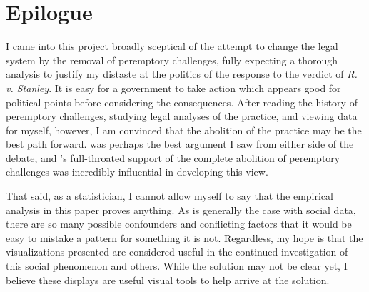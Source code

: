 \chapter*{Epilogue}
\label{s:Epilogue}

I came into this project broadly sceptical of the attempt to change the legal system by the removal of peremptory challenges,
fully expecting a thorough analysis to justify my distaste at the politics of the response to the verdict of
\textit{R. v. Stanley}. It is easy for a government to take action which appears good for political points before considering the
consequences. After reading the history of peremptory challenges, studying legal analyses of the practice, and viewing data for
myself, however, I am convinced that the abolition of the practice may be the best path forward. \cite{hoffman1997} was perhaps
the best argument I saw from either side of the debate, and \citeauthor{hoffman1997}'s full-throated support of the complete
abolition of peremptory challenges was incredibly influential in developing this view.

That said, as a statistician, I cannot allow myself to say that the empirical analysis in this paper proves anything. As is
generally the case with social data, there are so many possible confounders and conflicting factors that it would be easy to
mistake a pattern for something it is not. Regardless, my hope is that the visualizations presented are considered useful in the
continued investigation of this social phenomenon and others. While the solution may not be clear yet, I believe these displays
are useful visual tools to help arrive at the solution.




